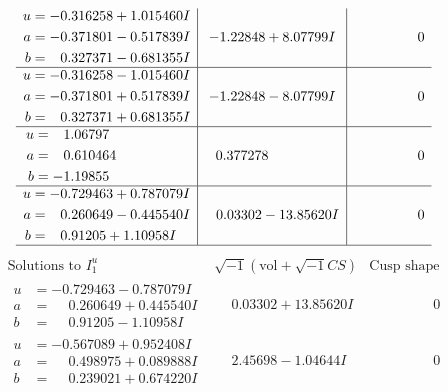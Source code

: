 \documentclass[1p]{elsarticle_modified}
\theoremstyle{definition}
\newcommand{\I}{\sqrt{-1}}
\begin{document}
$$\begin{array}{c|c|c}
\begin{aligned}
u &= -0.316258 + 1.015460 I \\
a &= -0.371801 - 0.517839 I \\
b &= \phantom{-}0.327371 - 0.681355 I\end{aligned}
 & -1.22848 + 8.07799 I & \phantom{-0.000000 } 0 \\ \hline\begin{aligned}
u &= -0.316258 - 1.015460 I \\
a &= -0.371801 + 0.517839 I \\
b &= \phantom{-}0.327371 + 0.681355 I\end{aligned}
 & -1.22848 - 8.07799 I & \phantom{-0.000000 } 0 \\ \hline\begin{aligned}
u &= \phantom{-}1.06797\phantom{ +0.000000I} \\
a &= \phantom{-}0.610464\phantom{ +0.000000I} \\
b &= -1.19855\phantom{ +0.000000I}\end{aligned}
 & \phantom{-}0.377278\phantom{ +0.000000I} & \phantom{-0.000000 } 0 \\ \hline\begin{aligned}
u &= -0.729463 + 0.787079 I \\
a &= \phantom{-}0.260649 - 0.445540 I \\
b &= \phantom{-}0.91205 + 1.10958 I\end{aligned}
 & \phantom{-}0.03302 - 13.85620 I & \phantom{-0.000000 } 0\\
 \hline 
 \end{array}$$\newpage$$\begin{array}{c|c|c}  
\text{Solutions to }I^u_{1}& \I (\text{vol} + \sqrt{-1}CS) & \text{Cusp shape}\\
 \hline 
\begin{aligned}
u &= -0.729463 - 0.787079 I \\
a &= \phantom{-}0.260649 + 0.445540 I \\
b &= \phantom{-}0.91205 - 1.10958 I\end{aligned}
 & \phantom{-}0.03302 + 13.85620 I & \phantom{-0.000000 } 0 \\ \hline\begin{aligned}
u &= -0.567089 + 0.952408 I \\
a &= \phantom{-}0.498975 + 0.089888 I \\
b &= \phantom{-}0.239021 + 0.674220 I\end{aligned}
 & \phantom{-}2.45698 - 1.04644 I & \phantom{-0.000000 } 0 \\ \hline\begin{aligned}

\end{aligned}
\end{array}$$
\end{document}
